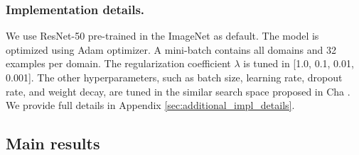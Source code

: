 \subsubsection{Implementation details.}
We use ResNet-50 \cite{he2016_cvpr_resnet} pre-trained in the ImageNet \cite{russakovsky2015imagenet} as default. The model is optimized using Adam \cite{kingma2015adam} optimizer. A mini-batch contains all domains and 32 examples per domain.
The regularization coefficient $\lambda$ is tuned in [1.0, 0.1, 0.01, 0.001].
The other hyperparameters, such as batch size, learning rate, dropout rate, and weight decay, are tuned in the similar search space proposed in Cha \etal \cite{cha2021swad}. We provide full details in Appendix \ref{sec:additional_impl_details}.




\subsection{Main results}


